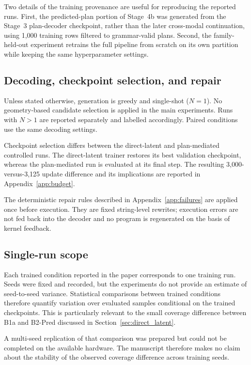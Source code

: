 \documentclass[preprint,12pt]{elsarticle}
\begin{document}
Two details of the training provenance are useful for reproducing the reported
runs. First, the predicted-plan portion of Stage~4b was generated from the
Stage~3 plan-decoder checkpoint, rather than the later cross-modal continuation,
using 1,000 training rows filtered to grammar-valid plans. Second, the
family-held-out experiment retrains the full pipeline from scratch on its own
partition while keeping the same hyperparameter settings.

\subsection{Decoding, checkpoint selection, and repair}
\label{app:decoding}

Unless stated otherwise, generation is greedy and single-shot ($N=1$). No
geometry-based candidate selection is applied in the main experiments. Runs
with $N>1$ are reported separately and labelled accordingly. Paired conditions
use the same decoding settings.

Checkpoint selection differs between the direct-latent and plan-mediated
controlled runs. The direct-latent trainer restores its best validation
checkpoint, whereas the plan-mediated run is evaluated at its final step. The
resulting 3,000-versus-3,125 update difference and its implications are
reported in Appendix~\ref{app:budget}.

The deterministic repair rules described in Appendix~\ref{app:failures} are
applied once before execution. They are fixed string-level rewrites; execution
errors are not fed back into the decoder and no program is regenerated on the
basis of kernel feedback.

\subsection{Single-run scope}
\label{app:single_run}

Each trained condition reported in the paper corresponds to one training run.
Seeds were fixed and recorded, but the experiments do not provide an estimate
of seed-to-seed variance. Statistical comparisons between trained conditions
therefore quantify variation over evaluated samples conditional on the trained
checkpoints. This is particularly relevant to the small coverage difference
between B1a and B2-Pred discussed in Section~\ref{sec:direct_latent}.

A multi-seed replication of that comparison was prepared but could not be
completed on the available hardware. The manuscript therefore makes no claim
about the stability of the observed coverage difference across training seeds.
\end{document}
